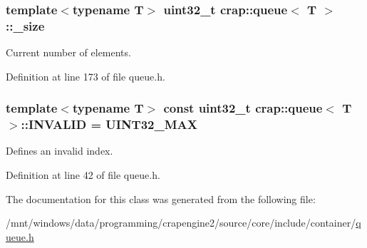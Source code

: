 \subsubsection[{\+\_\+size}]{\setlength{\rightskip}{0pt plus 5cm}template$<$typename T$>$ uint32\+\_\+t {\bf crap\+::queue}$<$ T $>$\+::\+\_\+size\hspace{0.3cm}{\ttfamily [protected]}}\label{classcrap_1_1queue_a6025cd210773605e1b78d9136c020409}


Current number of elements. 



Definition at line 173 of file queue.\+h.

\hypertarget{classcrap_1_1queue_a0515fc038b1eb4d6af4fd1612de127c5}{}
\subsubsection[{I\+N\+V\+A\+L\+I\+D}]{\setlength{\rightskip}{0pt plus 5cm}template$<$typename T$>$ const uint32\+\_\+t {\bf crap\+::queue}$<$ T $>$\+::I\+N\+V\+A\+L\+I\+D = {\bf U\+I\+N\+T32\+\_\+\+M\+A\+X}\hspace{0.3cm}{\ttfamily [static]}}\label{classcrap_1_1queue_a0515fc038b1eb4d6af4fd1612de127c5}


Defines an invalid index. 



Definition at line 42 of file queue.\+h.



The documentation for this class was generated from the following file\+:\begin{DoxyCompactItemize}
\item 
/mnt/windows/data/programming/crapengine2/source/core/include/container/\hyperlink{queue_8h}{queue.\+h}\end{DoxyCompactItemize}
